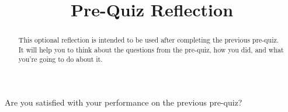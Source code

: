 \documentclass{ximera}
\title{Pre-Quiz Reflection}
\begin{document}
\begin{abstract}
This optional reflection is intended to be used after completing the previous pre-quiz.  It will help you to think about the questions from the pre-quiz, how you did, and what you're going to do about it. 
\end{abstract}
\maketitle

\begin{problem}
    Are you satisfied with your performance on the previous pre-quiz?

  \begin{multipleChoice}
  \end{multipleChoice}
\end{problem}
\end{document}

